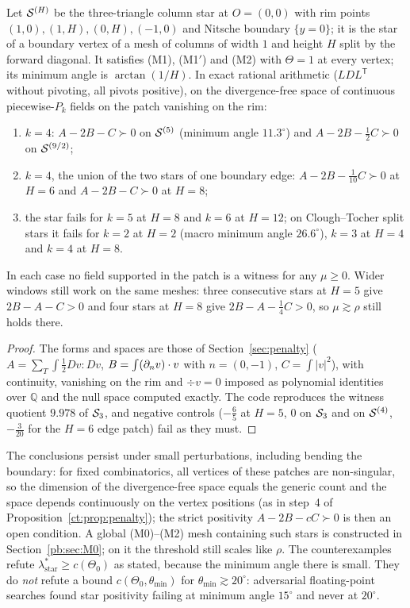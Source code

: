 \begin{proposition}\label{pb:counter}
Let $\mathcal S^{(H)}$ be the three-triangle column star at $O=(0,0)$ with rim points $(1,0),(1,H),(0,H),(-1,0)$ and Nitsche boundary $\{y=0\}$; it is the star of a boundary vertex of a mesh of columns of width $1$ and height $H$ split by the forward diagonal. It satisfies (M1), (M1$'$) and (M2) with $\Theta=1$ at every vertex; its minimum angle is $\arctan(1/H)$. In exact rational arithmetic ($LDL^{\mathsf T}$ without pivoting, all pivots positive), on the divergence-free space of continuous piecewise-$P_k$ fields on the patch vanishing on the rim:
\begin{enumerate}[label=(\alph*)]
\item $k=4$: $A-2B-C\succ0$ on $\mathcal S^{(5)}$ (minimum angle $11.3^\circ$) and $A-2B-\frac12C\succ0$ on $\mathcal S^{(9/2)}$;
\item $k=4$, the union of the two stars of one boundary edge: $A-2B-\frac1{10}C\succ0$ at $H=6$ and $A-2B-C\succ0$ at $H=8$;
\item the star fails for $k=5$ at $H=8$ and $k=6$ at $H=12$; on Clough--Tocher split stars it fails for $k=2$ at $H=2$ (macro minimum angle $26.6^\circ$), $k=3$ at $H=4$ and $k=4$ at $H=8$.
\end{enumerate}
In each case no field supported in the patch is a witness for any $\mu\ge0$. Wider windows still work on the same meshes: three consecutive stars at $H=5$ give $2B-A-C>0$ and four stars at $H=8$ give $2B-A-\frac14C>0$, so $\mu\gtrsim\rho$ still holds there.
\end{proposition}

\begin{proof}
The forms and spaces are those of Section~\ref{sec:penalty} ($A=\sum_T\int\frac12Dv:Dv$, $B=\int(\partial_n v)\cdot v$ with $n=(0,-1)$, $C=\int|v|^2$), with continuity, vanishing on the rim and $\div v=0$ imposed as polynomial identities over $\mathbb Q$ and the null space computed exactly. The code reproduces the witness quotient $9.978$ of $\mathcal S_3$, and negative controls ($-\frac65$ at $H=5$, $0$ on $\mathcal S_3$ and on $\mathcal S^{(4)}$, $-\frac3{20}$ for the $H=6$ edge patch) fail as they must.
\end{proof}

The conclusions persist under small perturbations, including bending the boundary: for fixed combinatorics, all vertices of these patches are non-singular, so the dimension of the divergence-free space equals the generic count and the space depends continuously on the vertex positions (as in step~4 of Proposition~\ref{ct:prop:penalty}); the strict positivity $A-2B-cC\succ0$ is then an open condition. A global (M0)--(M2) mesh containing such stars is constructed in Section~\ref{pb:sec:M0}; on it the threshold still scales like $\rho$. The counterexamples refute $\lambda^\ast_{\text{star}}\ge c(\Theta_0)$ as stated, because the minimum angle there is small. They do \emph{not} refute a bound $c(\Theta_0,\theta_{\min})$ for $\theta_{\min}\gtrsim20^\circ$: adversarial floating-point searches found star positivity failing at minimum angle $15^\circ$ and never at $20^\circ$.

